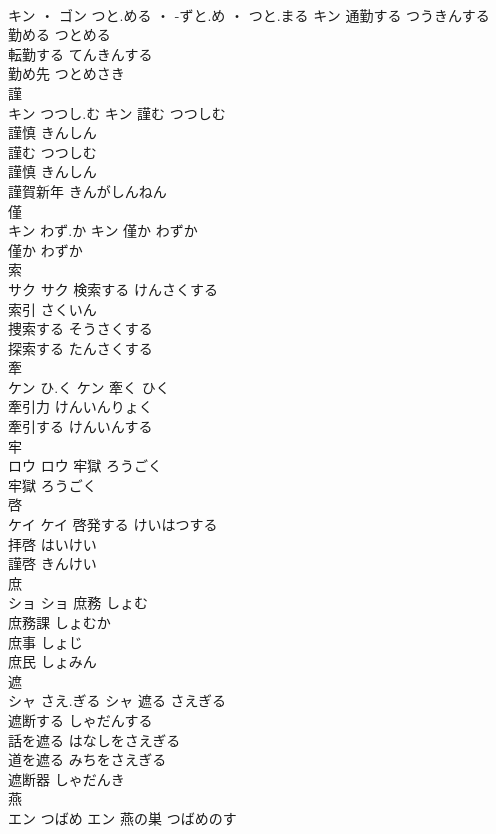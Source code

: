 \documentclass[8pt]{extreport}
\begin{document}
\begin{CJK}{UTF8}{min}
\\	キン ・ ゴン	つと.める ・ -ずと.め ・ つと.まる	キン	通勤する	つうきんする	
\\	勤める	つとめる	
\\	転勤する	てんきんする	
\\	勤め先	つとめさき	
\\	謹	
\\	キン	つつし.む	キン	謹む	つつしむ	
\\	謹慎	きんしん	
\\	謹む	つつしむ	
\\	謹慎	きんしん	
\\	謹賀新年	きんがしんねん	
\\	僅	
\\	キン	わず.か	キン	僅か	わずか	
\\	僅か	わずか	
\\	索	
\\	サク		サク	検索する	けんさくする	
\\	索引	さくいん	
\\	捜索する	そうさくする	
\\	探索する	たんさくする	
\\	牽	
\\	ケン	ひ.く	ケン	牽く	ひく	
\\	牽引力	けんいんりょく	
\\	牽引する	けんいんする	
\\	牢	
\\	ロウ		ロウ	牢獄	ろうごく	
\\	牢獄	ろうごく	
\\	啓	
\\	ケイ		ケイ	啓発する	けいはつする	
\\	拝啓	はいけい	
\\	謹啓	きんけい	
\\	庶	
\\	ショ		ショ	庶務	しょむ	
\\	庶務課	しょむか	
\\	庶事	しょじ	
\\	庶民	しょみん	
\\	遮	
\\	シャ	さえ.ぎる	シャ	遮る	さえぎる	
\\	遮断する	しゃだんする	
\\	話を遮る	はなしをさえぎる	
\\	道を遮る	みちをさえぎる	
\\	遮断器	しゃだんき	
\\	燕	
\\	エン	つばめ	エン	燕の巣	つばめのす	

\end{CJK}
\end{document}
